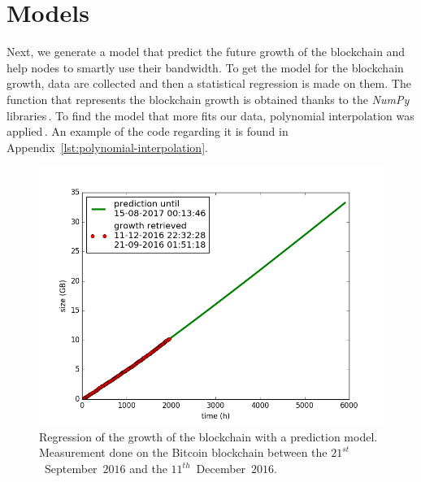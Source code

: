 \documentclass[USenglish]{uit-thesis}
\begin{document}
\section{Models}
\label{sec:models}

Next, we generate a model
that predict the future growth of the blockchain and help nodes to smartly use their bandwidth.
To get the model for the blockchain growth, data are collected and then a statistical
regression is made on them. The function that represents the blockchain growth is obtained
thanks to the \emph{NumPy} libraries\,\cite{scipy}. To find the model that more fits our data, polynomial
interpolation was applied\,\cite{numerical_analysis}. An example of the code regarding it is found
in Appendix~\ref{lst:polynomial-interpolation}.

\begin{figure}[H]
	\centering
	\includegraphics[width=1\textwidth]{img/regression_growth_blockchain}
	\caption{Regression of the growth of the blockchain with a prediction model.
		Measurement done on the
		Bitcoin blockchain between the $21^{st}$~September~$2016$ and the
		$11^{th}$~December~$2016$.}
	\label{fig:regression_growth}
\end{figure}
\end{document}
